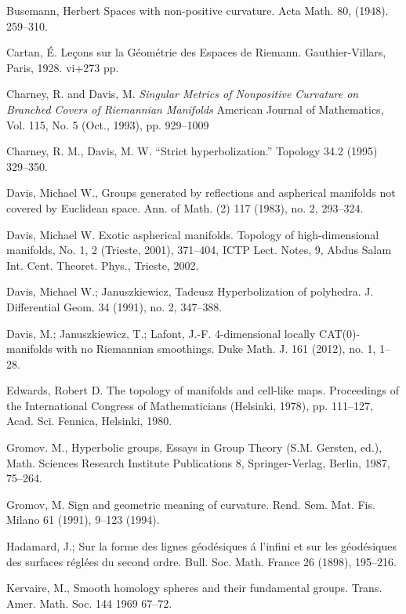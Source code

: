 \begin{thebibliography}{52}
Busemann, Herbert 
Spaces with non-positive curvature. Acta Math. 80, (1948). 259--310.

Cartan, \'E.
Le\c{c}ons sur la G\'eom\'etrie des Espaces de Riemann. 
Gauthier-Villars, Paris, 1928. vi+273 pp.

Charney, R. and  Davis, M.
\textit{Singular Metrics of Nonpositive Curvature on Branched Covers of Riemannian Manifolds}
American Journal of Mathematics, Vol. 115, No. 5 (Oct., 1993), pp. 929--1009

Charney, R. M., Davis, M. W. 
``Strict hyperbolization.'' Topology 34.2 (1995) 329--350.

Davis, Michael W., Groups generated by reflections and aspherical manifolds not covered by Euclidean space.
Ann. of Math. (2) 117 (1983), no. 2, 293--324. 

 Davis, Michael W. Exotic aspherical manifolds. Topology of high-dimensional manifolds, No. 1, 2 (Trieste, 2001), 371--404, ICTP Lect. Notes, 9, Abdus Salam Int. Cent. Theoret. Phys., Trieste, 2002.



 Davis, Michael W.; Januszkiewicz, Tadeusz Hyperbolization of polyhedra. J. Differential Geom. 34 (1991), no. 2, 347--388.

Davis, M.; 
Januszkiewicz, T.; 
Lafont, J.-F.
4-dimensional locally CAT(0)-manifolds with no Riemannian smoothings. 
Duke Math. J. 161 (2012), no. 1, 1--28.

 Edwards, Robert D. The topology of manifolds and cell-like maps. Proceedings of the International Congress of Mathematicians (Helsinki, 1978), pp. 111--127, Acad. Sci. Fennica, Helsinki, 1980.

Gromov. M.,
Hyperbolic groups, 
Essays in Group Theory (S.M. Gersten, ed.),
Math. Sciences Research Institute Publications 8,
Springer-Verlag, Berlin,
1987, 75--264.

Gromov, M.
Sign and geometric meaning of curvature. 
Rend. Sem. Mat. Fis. Milano 61 (1991), 9--123 (1994).

 Hadamard, J.;
Sur la forme des lignes g\'eod\'esiques \'a l'infini et sur les g\'eod\'esiques des surfaces r\'egl\'ees du second ordre.
Bull. Soc. Math. France 26 (1898), 195--216.

 Kervaire, M., 
Smooth homology spheres and their fundamental groups.
Trans. Amer. Math. Soc. 144 1969 67--72.


\end{thebibliography}
